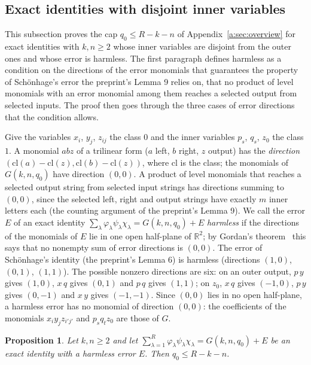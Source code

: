 \documentclass[11pt]{article}
\newtheorem{proposition}[theorem]{Proposition}
\theoremstyle{definition}
\theoremstyle{remark}
\begin{document}
\subsection{Exact identities with disjoint inner variables}\label{a:sec:exact}

This subsection proves the cap $q_0\le R-k-n$ of Appendix~\ref{a:sec:overview} for exact identities with $k,n\ge2$ whose inner variables are disjoint from the outer ones and whose error is harmless. The first paragraph defines harmless as a condition on the directions of the error monomials that guarantees the property of Schönhage's error the preprint's Lemma 9 relies on, that no product of level monomials with an error monomial among them reaches a selected output from selected inputs. The proof then goes through the three cases of error directions that the condition allows.

Give the variables $x_i$, $y_j$, $z_{ij}$ the class $0$ and the inner variables $p_s$, $q_s$, $z_0$ the class $1$. A monomial $abz$ of a trilinear form ($a$ left, $b$ right, $z$ output) has the \emph{direction} $(\mathrm{cl}(a)-\mathrm{cl}(z),\mathrm{cl}(b)-\mathrm{cl}(z))$, where $\mathrm{cl}$ is the class; the monomials of $G(k,n,q_0)$ have direction $(0,0)$. A product of level monomials that reaches a selected output string from selected input strings has directions summing to $(0,0)$, since the selected left, right and output strings have exactly $m$ inner letters each (the counting argument of the preprint's Lemma 9). We call the error $E$ of an exact identity $\sum_\lambda\varphi_\lambda\psi_\lambda\chi_\lambda=G(k,n,q_0)+E$ \emph{harmless} if the directions of the monomials of $E$ lie in one open half-plane of $\mathbb R^2$; by Gordan's theorem~\cite{Gor73} this says that no nonempty sum of error directions is $(0,0)$. The error of Schönhage's identity (the preprint's Lemma 6) is harmless (directions $(1,0)$, $(0,1)$, $(1,1)$). The possible nonzero directions are six: on an outer output, $p\,y$ gives $(1,0)$, $x\,q$ gives $(0,1)$ and $p\,q$ gives $(1,1)$; on $z_0$, $x\,q$ gives $(-1,0)$, $p\,y$ gives $(0,-1)$ and $x\,y$ gives $(-1,-1)$. Since $(0,0)$ lies in no open half-plane, a harmless error has no monomial of direction $(0,0)$: the coefficients of the monomials $x_iy_jz_{i'j'}$ and $p_sq_tz_0$ are those of $G$.

\begin{proposition}\label{a:prop:exact}
Let $k,n\ge2$ and let $\sum_{\lambda=1}^R\varphi_\lambda\psi_\lambda\chi_\lambda=G(k,n,q_0)+E$ be an exact identity with a harmless error $E$. Then $q_0\le R-k-n$.
\end{proposition}
\end{document}
